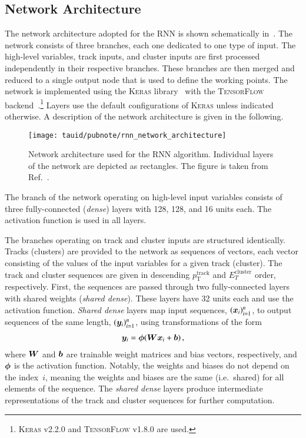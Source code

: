 \subsection{Network Architecture}

The network architecture adopted for the RNN \tauid is shown
schematically in~. The network
consists of three branches, each one dedicated to one type of
input. The high-level variables, track inputs, and cluster inputs are
first processed independently in their respective branches. These
branches are then merged and reduced to a single output node that is
used to define the \tauid working points. The network is implemented
using the \textsc{Keras} library~\cite{keras} with the
\textsc{TensorFlow}
backend~\cite{tensorflow2015-whitepaper}.\footnote{\textsc{Keras}
  v2.2.0 and \textsc{TensorFlow} v1.8.0 are used.} Layers use the
default configurations of \textsc{Keras} unless indicated otherwise. A
description of the network architecture is given in the following.

\begin{figure}[htbp]
  \centering

  \texttt{[image: tauid/pubnote/rnn\_network\_architecture]}

  \caption[Network architecture used for the RNN \tauid algorithm.]{Network
    architecture used for the RNN \tauid algorithm. Individual layers of the
    network are depicted as rectangles. The figure is taken from
    Ref.~\cite{ATL-PHYS-PUB-2019-033}.}%
  \label{fig:tauid_network_architecture}
\end{figure}

The branch of the network operating on high-level input variables
consists of three fully-connected (\emph{dense}) layers with 128, 128,
and 16 units each. The \ReLU~\cite{nair:relu} activation function is
used in all layers.

The branches operating on track and cluster inputs are structured
identically. Tracks (clusters) are provided to the network as
sequences of vectors, each vector consisting of the values of the
input variables for a given track (cluster). The track and cluster
sequences are given in descending $p_{\text{T}}^{\text{track}}$ and
$E_{T}^{\text{cluster}}$ order, respectively. First, the sequences are
passed through two fully-connected layers with shared weights
(\emph{shared dense}).  These layers have 32 units each and use the
\ReLU activation function. \emph{Shared dense} layers map input
sequences, $(\bm{x}_i)_{i=1}^{n}$, to output sequences of the same
length, $(\bm{y}_i)_{i=1}^{n}$, using transformations of the form
\begin{align*}
  \bm{y}_i = \bm{\phi}(\bm{W} \bm{x}_i + \bm{b}) \,\text{,}
\end{align*}
where $\bm{W}$ and $\bm{b}$ are trainable weight matrices and
bias vectors, respectively, and $\bm{\phi}$ is the activation
function.  Notably, the weights and biases do not depend on the
index~$i$, meaning the weights and biases are the same (i.e.\ shared)
for all elements of the sequence. The \emph{shared dense} layers
produce intermediate representations of the track and cluster
sequences for further computation.

